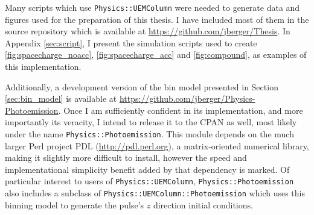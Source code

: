Many scripts which use \verb!Physics::UEMColumn! were needed to generate data and figures used for the preparation of this thesis.
I have included most of them in the source repository which is available at \url{https://github.com/jberger/Thesis}.
In Appendix \ref{sec:script}, I present the simulation scripts used to create \ref{fig:spacecharge_noacc}, \ref{fig:spacecharge_acc} and \ref{fig:compound}, as examples of this implementation.

Additionally, a development version of the bin model presented in Section \ref{sec:bin_model} is available at \url{https://github.com/jberger/Physics-Photoemission}.
Once I am sufficiently confident in its implementation, and more importantly its veracity, I intend to release it to the CPAN as well, most likely under the name \verb!Physics::Photoemission!.
This module depends on the much larger Perl project PDL (\url{http://pdl.perl.org}), a matrix-oriented numerical library, making it slightly more difficult to install, however the speed and implementational simplicity benefit added by that dependency is marked.
Of particular interest to users of \verb!Physics::UEMColumn!, \verb!Physics::Photoemission! also includes a subclass of \verb!Physics::UEMColumn::Photoemission! which uses this binning model to generate the pulse's $z$ direction initial conditions.


